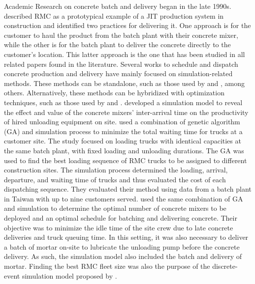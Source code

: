 \documentclass{article}
\begin{document}
Academic Research on concrete batch and delivery began in the late 1990s. \cite{tommelein1999just} described RMC as a prototypical example of a JIT production system in construction and identified two practices for delivering it. One approach is for the customer to haul the product from the batch plant with their concrete mixer, while the other is for the batch plant to deliver the concrete directly to the customer's location. This latter approach is the one that has been studied in all related papers found in the literature. Several works to schedule and dispatch concrete production and delivery have mainly focused on simulation-related methods. These methods can be standalone, such as those used by \cite{zayed2001simulation, wang2001scheduling} and  \cite{panas_simulation_based_2013}, among others. Alternatively, these methods can be hybridized with optimization techniques, such as those used by \cite{feng2004optimizing} and \cite{lu2005optimized}. \cite{wang2001scheduling} developed a simulation model to reveal the effect and value of the concrete mixers' inter-arrival time on the productivity of hired unloading equipment on site. \cite{feng2004optimizing} used a combination of genetic algorithm (GA) and simulation process to minimize the total waiting time for trucks at a customer site. The study focused on loading trucks with identical capacities at the same batch plant, with fixed loading and unloading durations. The GA was used to find the best loading sequence of RMC trucks to be assigned to different construction sites. The simulation process determined the loading, arrival, departure, and waiting time of trucks and thus evaluated the cost of each dispatching sequence. They evaluated their method using data from a batch plant in Taiwan with up to nine customers served. \cite{lu2005optimized} used the same combination of GA and simulation to determine the optimal number of concrete mixers to be deployed and an optimal schedule for batching and delivering concrete. Their objective was to minimize the idle time of the site crew due to late concrete deliveries and truck queuing time. In this setting, it was also necessary to deliver a batch of mortar on-site to lubricate the unloading pump before the concrete delivery. As such, the simulation model also included the batch and delivery of mortar. Finding the best RMC fleet size was also the purpose of the discrete-event simulation model proposed by \cite{panas_simulation_based_2013}.
\end{document}
